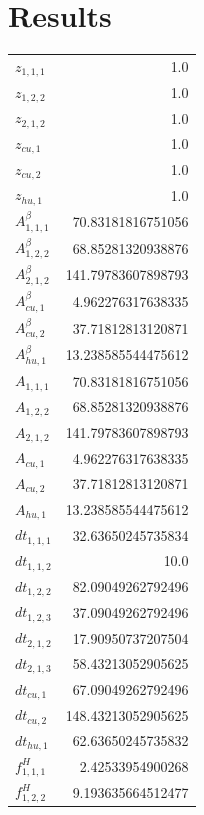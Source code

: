 \documentclass{article}%
\makeatletter
\let\mcnewpage=\newpage%
\newcommand{\TrickSupertabularIntoMulticols}{%
\renewcommand\newpage{%
\if@firstcolumn%
\hrule width\linewidth height0pt%
\columnbreak%
\else%
\mcnewpage%
\fi%
}%
}%
\makeatother
\begin{document}
\section{Results}%
\thispagestyle{plain}%
\begin{multicols*}{3}%
\TrickSupertabularIntoMulticols%
%
\begin{supertabular}{lr}%
	$z_{1,1,1}$ & 1.0 \\%
	$z_{1,2,2}$ & 1.0 \\%
	$z_{2,1,2}$ & 1.0 \\%
	$z_{cu,1}$ & 1.0 \\%
	$z_{cu,2}$ & 1.0 \\%
	$z_{hu,1}$ & 1.0 \\%
	$A_{1,1,1}^{\beta}$ & 70.83181816751056 \\%
	$A_{1,2,2}^{\beta}$ & 68.85281320938876 \\%
	$A_{2,1,2}^{\beta}$ & 141.79783607898793 \\%
	$A_{cu,1}^{\beta}$ & 4.962276317638335 \\%
	$A_{cu,2}^{\beta}$ & 37.71812813120871 \\%
	$A_{hu,1}^{\beta}$ & 13.238585544475612 \\%
	$A_{1,1,1}$ & 70.83181816751056 \\%
	$A_{1,2,2}$ & 68.85281320938876 \\%
	$A_{2,1,2}$ & 141.79783607898793 \\%
	$A_{cu,1}$ & 4.962276317638335 \\%
	$A_{cu,2}$ & 37.71812813120871 \\%
	$A_{hu,1}$ & 13.238585544475612 \\%
	$dt_{1,1,1}$ & 32.63650245735834 \\%
	$dt_{1,1,2}$ & 10.0 \\%
	$dt_{1,2,2}$ & 82.09049262792496 \\%
	$dt_{1,2,3}$ & 37.09049262792496 \\%
	$dt_{2,1,2}$ & 17.90950737207504 \\%
	$dt_{2,1,3}$ & 58.43213052905625 \\%
	$dt_{cu,1}$ & 67.09049262792496 \\%
	$dt_{cu,2}$ & 148.43213052905625 \\%
	$dt_{hu,1}$ & 62.63650245735832 \\%
	$f_{1,1,1}^{H}$ & 2.42533954900268 \\%
	$f_{1,2,2}^{H}$ & 9.193635664512477 \\%

\end{supertabular}
\end{multicols*}
\end{document}
